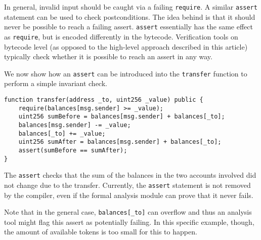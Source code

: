 In general, invalid input should be caught via a failing \texttt{require}.
A similar \texttt{assert} statement can be used to check postconditions.
The idea behind is that it should never be possible to reach a failing
assert.
\texttt{assert} essentially has the same effect as \texttt{require}, but
is encoded differently in the bytecode. Verification tools on bytecode
level (as opposed to the high-level approach described in this article)
typically check whether it is possible to reach an assert in any way.

We now show how an \texttt{assert} can be introduced into the \texttt{transfer} function
to perform a simple invariant check.
\begin{verbatim}
function transfer(address _to, uint256 _value) public {
    require(balances[msg.sender] >= _value);
    uint256 sumBefore = balances[msg.sender] + balances[_to];
    balances[msg.sender] -= _value;
    balances[_to] += _value;
    uint256 sumAfter = balances[msg.sender] + balances[_to];
    assert(sumBefore == sumAfter);
}
\end{verbatim}

The \texttt{assert} checks that the sum of the balances in the two
accounts involved did not change due to the transfer. Currently,
the \texttt{assert} statement is not removed by the compiler, even
if the formal analysis module can prove that it never fails.

Note that in the general case, \verb+balances[_to]+ can overflow
and thus an analysis tool might flag this assert as potentially
failing. In this specific example, though, the amount of available tokens
is too small for this to happen.
